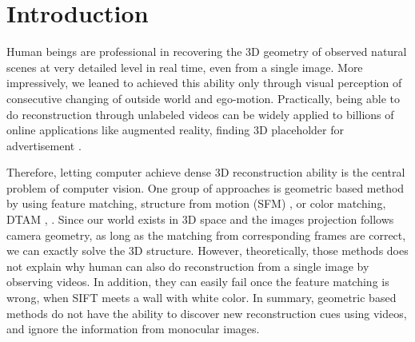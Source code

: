 \section{Introduction}
Human beings are professional in recovering the 3D geometry of observed natural scenes at very detailed level in real time, even from a single image. 
More impressively, we leaned to achieved this ability only through visual perception of consecutive changing of outside world and ego-motion. 
Practically, being able to do reconstruction through unlabeled videos can be widely applied to billions of online  applications like augmented reality, finding 3D placeholder for advertisement \etc.

Therefore, letting computer achieve dense 3D reconstruction ability is the central problem of computer vision. One group of approaches is geometric based method by using feature matching, \eg structure from motion (SFM) \cite{} \etc, or color matching, \eg DTAM \cite{}, \etc. 
Since our world exists in 3D space and the images projection follows camera geometry, as long as the matching from corresponding frames are correct, we can exactly solve the 3D structure. 
However, theoretically, those methods does not explain why human can also do reconstruction from a single image by observing videos. In addition, they can easily fail once the feature matching is wrong, \eg when SIFT\cite{} meets a wall with white color. 
In summary, geometric based methods do not have the ability to discover new reconstruction cues using videos, and ignore the information from monocular images.

